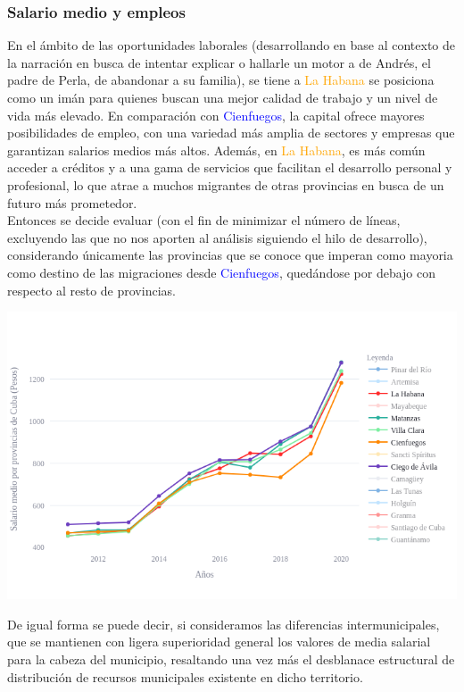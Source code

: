 \documentclass{article}
\begin{document}
\subsubsection{Salario medio y empleos}
En el ámbito de las oportunidades laborales (desarrollando en base al contexto de la narración en busca de intentar explicar o hallarle un motor a de Andrés, el padre de Perla, de abandonar a su familia), se tiene a \textcolor{orange}{La Habana} se posiciona como un imán para quienes buscan una mejor calidad de trabajo y un nivel de vida más elevado. En comparación con \textcolor{blue}{Cienfuegos}, la capital ofrece mayores posibilidades de empleo, con una variedad más amplia de sectores y empresas que garantizan salarios medios más altos. Además, en \textcolor{orange}{La Habana}, es más común acceder a créditos y a una gama de servicios que facilitan el desarrollo personal y profesional, lo que atrae a muchos migrantes de otras provincias en busca de un futuro más prometedor.\\
Entonces se decide evaluar (con el fin de minimizar el número de líneas, excluyendo las que no nos aporten al análisis siguiendo el hilo de desarrollo), considerando únicamente las provincias que se conoce que imperan como mayoria como destino de las migraciones desde \textcolor{blue}{Cienfuegos}, quedándose por debajo con respecto al resto de provincias. 
\begin{center}
    \includegraphics[width=1.0\textwidth]{img/fig6.png}
\end{center}
De igual forma se puede decir, si consideramos las diferencias intermunicipales, que se mantienen con ligera superioridad general los valores de media salarial para la cabeza del municipio, resaltando una vez más el desblanace estructural de distribución de recursos municipales existente en dicho territorio.
\end{document}
